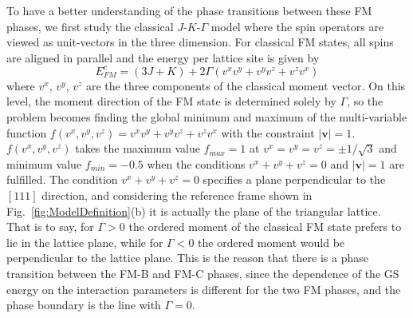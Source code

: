 \documentclass[aps,prb,reprint,amsfonts,amsmath,amssymb,showpacs,groupedaddress,superscriptaddress]{revtex4-1}
\begin{document}
To have a better understanding of the phase transitions between these FM phases, we first study the classical $J$-$K$-$\Gamma$ model where the spin operators are viewed as unit-vectors in the three dimension. For classical FM states, all spins are aligned in parallel and the energy per lattice site is given by
\begin{equation}
    E_{FM}^{c} = (3J + K) + 2 \Gamma (v^x v^y + v^y v^z + v^z v^x) \label{eq:EcFM}
\end{equation}
where $v^x$, $v^y$, $v^z$ are the three components of the classical moment vector. On this level, the moment direction of the FM state is determined solely by $\Gamma$, so the problem becomes finding the global minimum and maximum of the multi-variable function $f(v^x, v^y, v^z) = v^x v^y + v^y v^z + v^z v^x$ with the constraint $|\bm{v}| = 1$. $f(v^x, v^y, v^z)$ takes the maximum value $f_{max}=1$ at $v^x=v^y=v^z=\pm 1/\sqrt{3}$ and minimum value $f_{min}=-0.5$ when the conditions $v^x + v^y + v^z = 0$ and $|\bm{v}| = 1$ are fulfilled. The condition $v^x + v^y + v^z = 0$ specifies a plane perpendicular to the $[111]$ direction, and considering the reference frame shown in Fig.~\ref{fig:ModelDefinition}(b) it is actually the plane of the triangular lattice. That is to say, for $\Gamma > 0$ the ordered moment of the classical FM state prefers to lie in the lattice plane, while for $\Gamma<0$ the ordered moment would be perpendicular to the lattice plane. This is the reason that there is a phase transition between the FM-B and FM-C phases, since the dependence of the GS energy on the interaction parameters is different for the two FM phases, and the phase boundary is the line with $\Gamma=0$.
\end{document}
